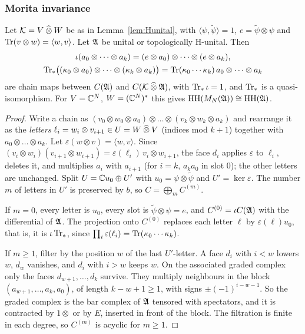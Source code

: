 \subsubsection*{Morita invariance}

\begin{lemma}\label{ha:lem:morita}
Let \(\mathcal K=V\mathbin{\widehat\otimes} W\) be as in Lemma~\ref{lem:Hunital}, with
\(\langle\psi,\tilde\psi\rangle=1\), \(e=\tilde\psi\otimes\psi\) and
\(\operatorname{Tr}(v\otimes w)=\langle w,v\rangle\). Let \(\mathfrak A\) be unital or
topologically H-unital. Then
\begin{gather*}
 \iota(a_0\otimes\dots\otimes a_k)=(e\otimes a_0)\otimes\dots\otimes
 (e\otimes a_k),\\
 \operatorname{Tr}_*\bigl((\kappa_0\otimes a_0)\otimes\dots\otimes
 (\kappa_k\otimes a_k)\bigr)=\operatorname{Tr}(\kappa_0\cdots\kappa_k)\,a_0\otimes\dots
 \otimes a_k
\end{gather*}
are chain maps between \(C(\mathfrak A)\) and \(C(\mathcal K\mathbin{\widehat\otimes}\mathfrak A)\), with
\(\operatorname{Tr}_*\iota=1\), and \(\operatorname{Tr}_*\) is a quasi-isomorphism. For
\(V=\mathbb C^N\), \(W=(\mathbb C^N)^*\) this gives \(\operatorname{HH}(M_N(\mathfrak A))\cong\operatorname{HH}(\mathfrak A)\).
\end{lemma}

\begin{proof}
Write a chain as \((v_0\otimes w_0\otimes a_0)\otimes\dots\otimes(v_k
\otimes w_k\otimes a_k)\) and rearrange it as the \emph{letters}
\(\ell_i=w_i\otimes v_{i+1}\in U=W\mathbin{\widehat\otimes} V\) (indices mod \(k+1\)) together
with \(a_0\otimes\dots\otimes a_k\). Let \(\varepsilon(w\otimes v)=
\langle w,v\rangle\). Since \((v_i\otimes w_i)(v_{i+1}\otimes w_{i+1})=
\varepsilon(\ell_i)\,v_i\otimes w_{i+1}\), the face \(d_i\) applies
\(\varepsilon\) to \(\ell_i\), deletes it, and multiplies \(a_i\) with
\(a_{i+1}\) (for \(i=k\), \(a_ka_0\) in slot \(0\)); the other letters are
unchanged. Split \(U=\mathbb C u_0\oplus U'\) with \(u_0=\psi\otimes\tilde\psi\)
and \(U'=\ker\varepsilon\). The number \(m\) of letters in \(U'\) is
preserved by \(b\), so \(C=\bigoplus_mC^{(m)}\).

If \(m=0\), every letter is \(u_0\), every slot is \(\tilde\psi\otimes
\psi=e\), and \(C^{(0)}=\iota C(\mathfrak A)\) with the differential of \(\mathfrak A\).
The projection onto \(C^{(0)}\) replaces each letter \(\ell\) by
\(\varepsilon(\ell)u_0\), that is, it is \(\iota\operatorname{Tr}_*\), since
\(\prod_i\varepsilon(\ell_i)=\operatorname{Tr}(\kappa_0\cdots\kappa_k)\).

If \(m\ge1\), filter by the position \(w\) of the last \(U'\)-letter. A
face \(d_i\) with \(i<w\) lowers \(w\), \(d_w\) vanishes, and \(d_i\) with
\(i>w\) keeps \(w\). On the associated graded complex only the faces
\(d_{w+1},\dots,d_k\) survive. They multiply neighbours in the block
\((a_{w+1},\dots,a_k,a_0)\), of length \(k-w+1\ge1\), with signs
\(\pm(-1)^{i-w-1}\). So the graded complex is the bar complex of \(\mathfrak A\)
tensored with spectators, and it is contracted by \(1\otimes\) or by
\(E\), inserted in front of the block. The filtration is finite in each
degree, so \(C^{(m)}\) is acyclic for \(m\ge1\).
\end{proof}

